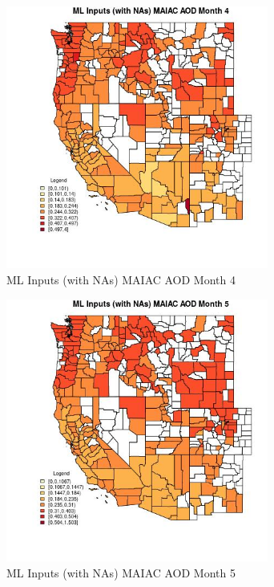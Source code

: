 \begin{figure} 
\centering  
\includegraphics[width=0.77\textwidth]{Code_Outputs/Report_ML_input_PM25_Step4_part_f_de_duplicated_aveswNAs_CountyMAIAC_AODmedianMonth4.jpg} 
\caption{\label{fig:Report_ML_input_PM25_Step4_part_f_de_duplicated_aveswNAsCountyMAIAC_AODmedianMonth4}ML Inputs (with NAs) MAIAC AOD Month 4} 
\end{figure} 
 

\begin{figure} 
\centering  
\includegraphics[width=0.77\textwidth]{Code_Outputs/Report_ML_input_PM25_Step4_part_f_de_duplicated_aveswNAs_CountyMAIAC_AODmedianMonth5.jpg} 
\caption{\label{fig:Report_ML_input_PM25_Step4_part_f_de_duplicated_aveswNAsCountyMAIAC_AODmedianMonth5}ML Inputs (with NAs) MAIAC AOD Month 5} 
\end{figure} 
 

